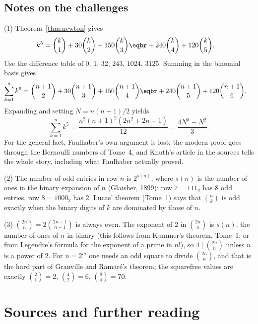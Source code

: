 \subsection*{Notes on the challenges}

(1) Theorem~\ref{thm:newton} gives
\[
\begin{aligned}
k^5&=\binom k1+30\binom k2+150\binom k3\eqbr+240\binom k4+120\binom k5.
\end{aligned}
\]
Use the difference table of $0$, $1$, $32$, $243$, $1024$, $3125$. Summing in the binomial basis gives
\[
\begin{aligned}
\sum_{k=1}^n k^5&=\binom{n+1}2+30\binom{n+1}3+150\binom{n+1}4\eqbr+240\binom{n+1}5+120\binom{n+1}6.
\end{aligned}
\]
Expanding and setting $N=n(n+1)/2$ yields
\[
\sum_{k=1}^n k^5=\frac{n^2(n+1)^2(2n^2+2n-1)}{12}=\frac{4N^3-N^2}3.
\]
For the general fact, Faulhaber's own argument is lost; the modern proof goes through the Bernoulli numbers of Tome~4, and Knuth's article in the sources tells the whole story, including what Faulhaber actually proved.

(2) The number of odd entries in row $n$ is $2^{s(n)}$, where $s(n)$ is the number of ones in the binary expansion of $n$ (Glaisher, 1899): row $7=111_2$ has $8$ odd entries, row $8=1000_2$ has $2$. Lucas' theorem (Tome~1) says that $\binom nk$ is odd exactly when the binary digits of $k$ are dominated by those of $n$.

(3) $\binom{2n}n=2\binom{2n-1}{n-1}$ is always even. The exponent of $2$ in $\binom{2n}n$ is $s(n)$, the number of ones of $n$ in binary (this follows from Kummer's theorem, Tome~1, or from Legendre's formula for the exponent of a prime in $n!$), so $4\mid\binom{2n}n$ unless $n$ is a power of $2$. For $n=2^m$ one needs an odd square to divide $\binom{2n}n$, and that is the hard part of Granville and Ramar\'e's theorem; the squarefree values are exactly $\binom21=2$, $\binom42=6$, $\binom84=70$.

\section*{Sources and further reading}

